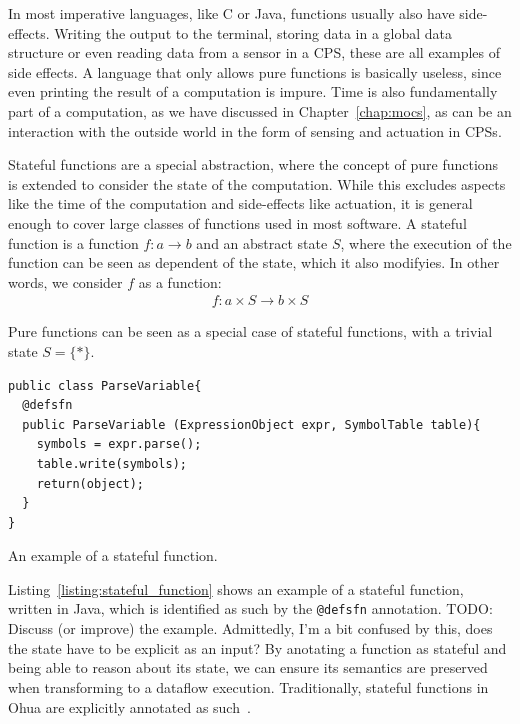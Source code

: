 In most imperative languages, like C or Java, functions usually also have side-effects. Writing the output to the terminal, storing data in a global data structure or even reading data from a sensor in a \ac{CPS}, these are all examples of side effects.
A language that only allows pure functions is basically useless, since even printing the result of a computation is impure.
Time is also fundamentally part of a computation, as we have discussed in Chapter~\ref{chap:mocs}, as can be an interaction with the outside world in the form of sensing and actuation in \acp{CPS}.

Stateful functions are a special abstraction, where the concept of pure functions is extended to consider the state of the computation. 
While this excludes aspects like the time of the computation and side-effects like actuation, it is general enough to cover large classes of functions used in most software.
A stateful function is a function $f : a \rightarrow b$ and an abstract state $S$, where the execution of the function can be seen as dependent of the state, which it also modifyies.
In other words, we consider $f$ as a function:
\begin{align}
  f : a \times S \rightarrow b \times S \label{eqn:state_thread}
\end{align}

Pure functions can be seen as a special case of stateful functions, with a trivial state $S = \{*\}$.

\begin{listing}
\begin{verbatim}
public class ParseVariable{
  @defsfn
  public ParseVariable (ExpressionObject expr, SymbolTable table){
    symbols = expr.parse();
    table.write(symbols);
    return(object);
  }
}
\end{verbatim}
\caption{An example of a stateful function.}
\label{listing:stateful_function}
\end{listing}


Listing~\ref{listing:stateful_function} shows an example of a stateful function, written in Java, which is identified as such by the \texttt{@defsfn} annotation.
TODO: Discuss (or improve) the example. Admittedly, I'm a bit confused by this, does the state have to be explicit as an input?
By anotating a function as stateful and being able to reason about its state, we can ensure its semantics are preserved when transforming to a dataflow execution.
Traditionally, stateful functions in Ohua are explicitly annotated as such~\cite{ertel_pmam18}.


